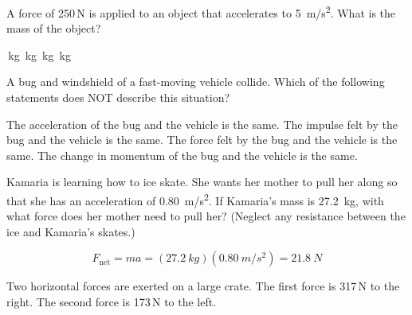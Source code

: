 \documentclass[answers]{exam}
\begin{document}
\begin{questions}
\question 
A force of 250\,N is applied to an object that accelerates to \SI{5}{m/s^2}. What is the mass of the object?

\begin{randomizechoices}
    \,kg 
    \,kg
    \,kg
    \,kg
\end{randomizechoices}

\question %
A bug and windshield of a fast-moving vehicle collide. Which of the following statements does NOT describe this situation?

\begin{randomizechoices}
    \correctchoice The acceleration of the bug and the vehicle is the same.
    \choice The impulse felt by the bug and the vehicle is the same.
    \choice The force felt by the bug and the vehicle is the same.
    \choice The change in momentum of the bug and the vehicle is the same.
\end{randomizechoices}

\question
Kamaria is learning how to ice skate. She wants her mother to pull her along so that she has an acceleration of \SI{0.80}{m/s^2}. If Kamaria's mass is \SI{27.2}{kg}, with what force does her mother need to pull her? (Neglect any resistance between the ice and Kamaria’s skates.)

\begin{solution}
\phantom{.}

\begin{equation*}
    F_\mathrm{net} = m a = (\SI{27.2}{kg})(\SI{0.80}{m/s^2}) = \boxed{\SI{21.8}{N}}
\end{equation*}
\end{solution}

\question
Two horizontal forces are exerted on a large crate. The first force is 317\,N to the right. The second force is 173\,N to the left. 

\end{questions}
\end{document}
